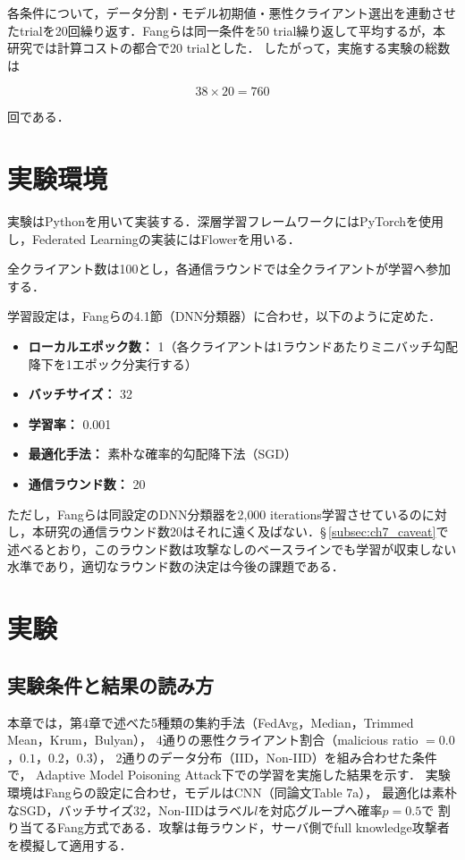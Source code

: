 \documentclass[a4j, twocolumn, dvipdfmx]{jsarticle}  %
\begin{document}
各条件について，データ分割・モデル初期値・悪性クライアント選出を連動させたtrialを20回繰り返す．Fangら\cite{fang2020local}は同一条件を50 trial繰り返して平均するが，本研究では計算コストの都合で20 trialとした．
したがって，実施する実験の総数は

\[
38 \times 20 = 760
\]

回である．

\section{実験環境}

実験はPythonを用いて実装する．深層学習フレームワークにはPyTorchを使用し，Federated Learningの実装にはFlowerを用いる．

全クライアント数は100とし，各通信ラウンドでは全クライアントが学習へ参加する．

学習設定は，Fangら\cite{fang2020local}の4.1節（DNN分類器）に合わせ，以下のように定めた．

\begin{itemize}
    \item \textbf{ローカルエポック数：} 1（各クライアントは1ラウンドあたりミニバッチ勾配降下を1エポック分実行する）
    \item \textbf{バッチサイズ：} 32
    \item \textbf{学習率：} 0.001
    \item \textbf{最適化手法：} 素朴な確率的勾配降下法（SGD）
    \item \textbf{通信ラウンド数：} 20
\end{itemize}

ただし，Fangらは同設定のDNN分類器を2{,}000 iterations学習させているのに対し，本研究の通信ラウンド数20はそれに遠く及ばない．\S\,\ref{subsec:ch7_caveat}で述べるとおり，このラウンド数は攻撃なしのベースラインでも学習が収束しない水準であり，適切なラウンド数の決定は今後の課題である．


\section{実験}

\subsection{実験条件と結果の読み方}

本章では，第4章で述べた5種類の集約手法（FedAvg，Median，Trimmed Mean，Krum，Bulyan），
4通りの悪性クライアント割合（malicious ratio $=0.0$，$0.1$，$0.2$，$0.3$），
2通りのデータ分布（IID，Non-IID）を組み合わせた条件で，
Adaptive Model Poisoning Attack下での学習を実施した結果を示す．
実験環境はFangら\cite{fang2020local}の設定に合わせ，モデルはCNN（同論文Table 7a），
最適化は素朴なSGD，バッチサイズ32，Non-IIDはラベル$l$を対応グループへ確率$p=0.5$で
割り当てるFang方式である．攻撃は毎ラウンド，サーバ側でfull knowledge攻撃者を模擬して適用する．
\end{document}
